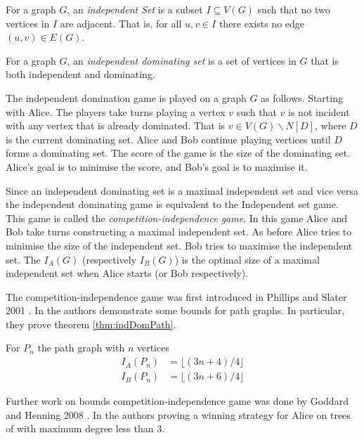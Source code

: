 \begin{definition}
    For a graph $G$, an \textit{independent Set} is a subset $I\subseteq V(G)$ such that no two vertices in $I$ are adjacent. That is, for all $u,v\in I$ there exists no edge $(u,v)\in E(G)$.
\end{definition}

\begin{definition}
   For a graph $G$, an \textit{independent dominating set} is a set of vertices in $G$ that is both independent and dominating.
\end{definition}

The independent domination game is played on a graph $G$ as follows. Starting with Alice. The players take turns playing a vertex $v$ such that $v$ is not incident with any vertex that is already dominated. That is $v\in V(G)\backslash N[D]$, where $D$ is the current dominating set. Alice and Bob continue playing vertices until $D$ forms a dominating set. The score of the game is the size of the dominating set. Alice's goal is to minimise the score, and Bob's goal is to maximise it.


Since an independent dominating set is a maximal independent set and vice versa the independent dominating game is equivalent to the Independent set game. This game is called the \textit{competition-independence game}. In this game Alice and Bob take turns constructing a maximal independent set. As before Alice tries to minimise the size of the independent set. Bob tries to maximise the independent set. The  $I_A(G)$ (respectively $I_B(G)$) is the optimal size of a maximal independent set when Alice starts (or Bob respectively). 

The competition-independence game was first introduced in Phillips and Slater 2001 \cite{PhillpsSlater2001}. In \cite{PhillpsSlater2001} the authors demonstrate some bounds for path graphs. In particular, they prove theorem \ref{thm:indDomPath}.
\begin{theorem}\label{thm:indDomPath}
    For $P_n$ the path graph with $n$ vertices
    \begin{align*}
    I_A(P_n) &=\lfloor(3n+4)/4\rfloor\\
    I_B(P_n) &=\lfloor(3n+6)/4\rfloor       
    \end{align*} 
\end{theorem}
Further work on bounds competition-independence game was done by Goddard and Henning 2008 \cite{GoddardHenning2018}. In \cite{GoddardHenning2018} the authors proving a winning strategy for Alice on trees of with maximum degree less than 3.

